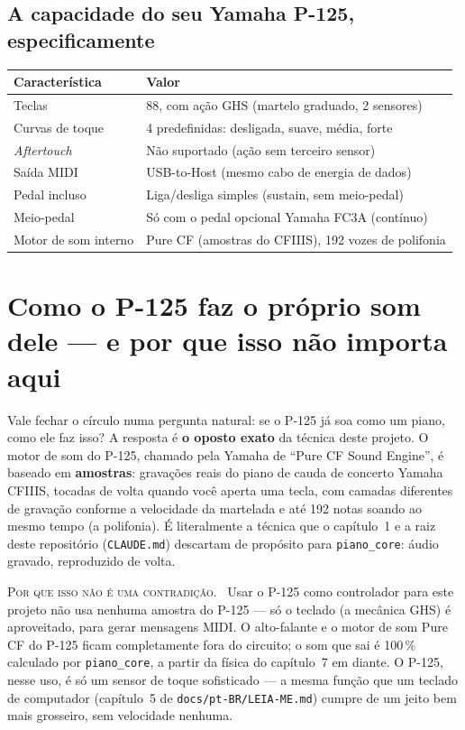 \documentclass[11pt,oneside]{book}
\newcommand{\nova}[1]{\textsc{\color{accent}#1.}~}
\begin{document}
\subsection*{A capacidade do seu Yamaha P-125, especificamente}

\begin{center}
\begin{tabular}{ll}
\toprule
Característica & Valor \\
\midrule
Teclas & 88, com ação GHS (martelo graduado, 2 sensores) \\
Curvas de toque & 4 predefinidas: desligada, suave, média, forte \\
\emph{Aftertouch} & Não suportado (ação sem terceiro sensor) \\
Saída MIDI & USB-to-Host (mesmo cabo de energia de dados) \\
Pedal incluso & Liga/desliga simples (sustain, sem meio-pedal) \\
Meio-pedal & Só com o pedal opcional Yamaha FC3A (contínuo) \\
Motor de som interno & Pure CF (amostras do CFIIIS), 192 vozes de polifonia \\
\bottomrule
\end{tabular}
\end{center}

\section*{Como o P-125 faz o próprio som dele --- e por que isso não importa
aqui}

Vale fechar o círculo numa pergunta natural: se o P-125 já soa como um
piano, como ele faz isso? A resposta é \textbf{o oposto exato} da técnica
deste projeto. O motor de som do P-125, chamado pela Yamaha de \enquote{Pure
CF Sound Engine}, é baseado em \textbf{amostras}: gravações reais do piano
de cauda de concerto Yamaha CFIIIS, tocadas de volta quando você aperta uma
tecla, com camadas diferentes de gravação conforme a velocidade da
martelada e até 192 notas soando ao mesmo tempo (a polifonia). É
literalmente a técnica que o capítulo~1 e a raiz deste repositório
(\texttt{CLAUDE.md}) descartam de propósito para \texttt{piano\_core}:
áudio gravado, reproduzido de volta.

\begin{newword}
\nova{Por que isso não é uma contradição} Usar o P-125 como controlador
para este projeto não usa nenhuma amostra do P-125 --- só o teclado (a
mecânica GHS) é aproveitado, para gerar mensagens MIDI. O alto-falante e
o motor de som Pure CF do P-125 ficam completamente fora do circuito; o
som que sai é 100\,\% calculado por \texttt{piano\_core}, a partir da
física do capítulo~7 em diante. O P-125, nesse uso, é só um sensor de
toque sofisticado --- a mesma função que um teclado de computador
(capítulo~5 de \texttt{docs/pt-BR/LEIA-ME.md}) cumpre de um jeito bem mais
grosseiro, sem velocidade nenhuma.
\end{newword}
\end{document}
